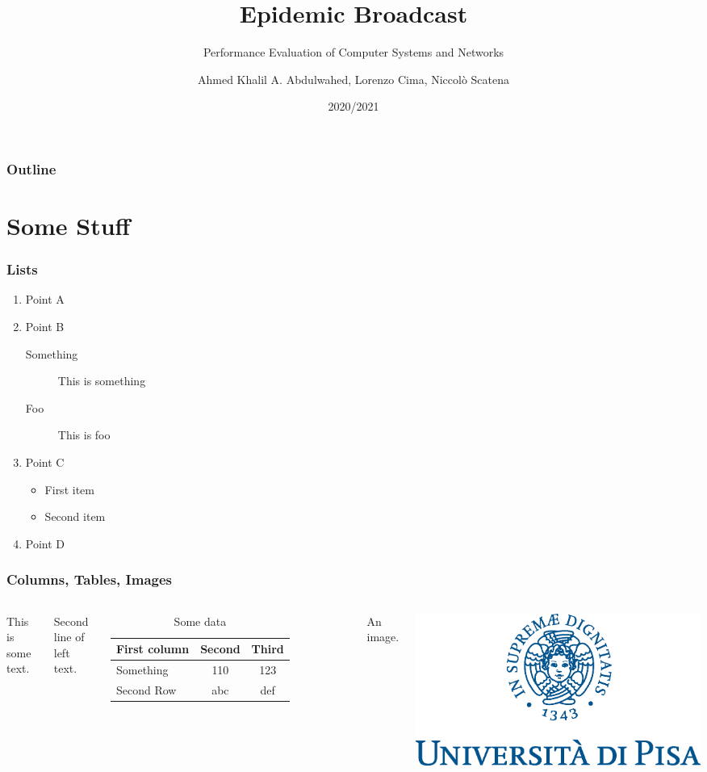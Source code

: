 \documentclass{beamer}
\title{Epidemic Broadcast}
\subtitle{Performance Evaluation of Computer Systems and Networks}
\author[Abdulwahed, Cima, Scatena]{Ahmed Khalil A. Abdulwahed, Lorenzo Cima, Niccolò Scatena}
\institute[UNIPI]{University of Pisa}
\date{2020/2021}
\begin{document}
\begin{frame}
	\titlepage{}
\end{frame}

\begin{frame}
	\frametitle{Outline}
	\tableofcontents
\end{frame}

\section{Some Stuff}

\begin{frame}
	\frametitle{Lists}
	\begin{enumerate}
		\item Point A
		\item Point B
		\begin{description}
			\item[Something] This is something
			\item[Foo] This is foo
		\end{description}
		\item Point C
		\begin{itemize}
			\item First item
			\item Second item
		\end{itemize}
		\item Point D
	\end{enumerate}
\end{frame}

\begin{frame}
	\frametitle{Columns, Tables, Images}
	\begin{columns}
		This is some text.

		Second line of left text.

		\begin{table}
			\begin{tabular}{l | c | c}
				First column & Second & Third \\
				\hline \hline
				Something & 110 & 123 \\
				Second Row & abc & def
			\end{tabular}
			\caption{Some data}
		\end{table}
		An image.

		\includegraphics[scale=0.2]{img/marchio_unipi_pant541}
	\end{columns}
\end{frame}
\end{document}
